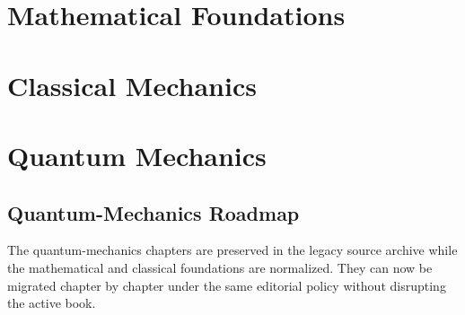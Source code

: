 \part{Mathematical Foundations}




\part{Classical Mechanics}



\part{Quantum Mechanics}
\chapter*{Quantum-Mechanics Roadmap}
The quantum-mechanics chapters are preserved in the legacy source archive while the mathematical and classical foundations are normalized. They can now be migrated chapter by chapter under the same editorial policy without disrupting the active book.
